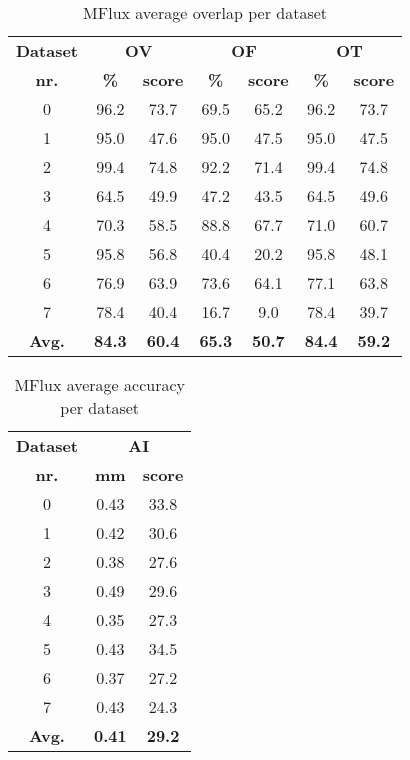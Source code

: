 \begin{table*}
\scriptsize
\caption{MFlux average overlap per dataset}
\centering
\begin{tabular}{|c|cc|cc|cc|}
\hline
\multicolumn{1}{|c|}{\textbf{Dataset}} &\multicolumn{2}{c|}{\textbf{OV}} &\multicolumn{2}{c|}{\textbf{OF}} &\multicolumn{2}{c|}{\textbf{OT}}\\
\multicolumn{1}{|c|}{\textbf{nr.}} &\multicolumn{1}{c|}{\textbf{\%}} &\multicolumn{1}{c|}{\textbf{score}} &\multicolumn{1}{c|}{\textbf{\%}} &\multicolumn{1}{c|}{\textbf{score}} &\multicolumn{1}{c|}{\textbf{\%}} &\multicolumn{1}{c|}{\textbf{score}}\\
\hline
0&96.2&73.7&69.5&65.2&96.2&73.7\\
1&95.0&47.6&95.0&47.5&95.0&47.5\\
2&99.4&74.8&92.2&71.4&99.4&74.8\\
3&64.5&49.9&47.2&43.5&64.5&49.6\\
4&70.3&58.5&88.8&67.7&71.0&60.7\\
5&95.8&56.8&40.4&20.2&95.8&48.1\\
6&76.9&63.9&73.6&64.1&77.1&63.8\\
7&78.4&40.4&16.7&9.0&78.4&39.7\\
\hline
\textbf{Avg.}&\textbf{84.3}&\textbf{60.4}&\textbf{65.3}&\textbf{50.7}&\textbf{84.4}&\textbf{59.2}\\
\hline
\end{tabular}
\vspace{-0.3cm}
\label{tb:tb_4_1}
\normalsize
\end{table*}

\begin{table*}
\scriptsize
\caption{MFlux average accuracy per dataset}
\centering
\begin{tabular}{|c|cc|}
\hline
\multicolumn{1}{|c|}{\textbf{Dataset}} &\multicolumn{2}{c|}{\textbf{AI}}\\
\multicolumn{1}{|c|}{\textbf{nr.}} &\multicolumn{1}{c|}{\textbf{mm}} &\multicolumn{1}{c|}{\textbf{score}}\\
\hline
0&0.43&33.8\\
1&0.42&30.6\\
2&0.38&27.6\\
3&0.49&29.6\\
4&0.35&27.3\\
5&0.43&34.5\\
6&0.37&27.2\\
7&0.43&24.3\\
\hline
\textbf{Avg.}&\textbf{0.41}&\textbf{29.2}\\
\hline
\end{tabular}
\vspace{-0.3cm}
\label{tb:tb_4_2}
\normalsize
\end{table*}

